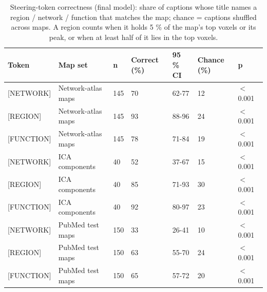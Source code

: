 \begin{table}[t]
\centering
\small
\caption{Steering-token correctness (final model): share of captions whose title names a region / network / function that matches the map; chance = captions shuffled across maps. A region counts when it holds 5 \% of the map's top voxels or its peak, or when at least half of it lies in the top voxels.}
\label{tab:steering_correctness}
\begin{tabular}{lllllll}
\toprule
Token & Map set & n & Correct (\%) & 95 \% CI & Chance (\%) & p \\
\midrule
{[}NETWORK{]} & Network-atlas maps & 145 & 70 & 62-77 & 12 & $<$ 0.001 \\
{[}REGION{]} & Network-atlas maps & 145 & 93 & 88-96 & 24 & $<$ 0.001 \\
{[}FUNCTION{]} & Network-atlas maps & 145 & 78 & 71-84 & 19 & $<$ 0.001 \\
{[}NETWORK{]} & ICA components & 40 & 52 & 37-67 & 15 & $<$ 0.001 \\
{[}REGION{]} & ICA components & 40 & 85 & 71-93 & 30 & $<$ 0.001 \\
{[}FUNCTION{]} & ICA components & 40 & 92 & 80-97 & 23 & $<$ 0.001 \\
{[}NETWORK{]} & PubMed test maps & 150 & 33 & 26-41 & 10 & $<$ 0.001 \\
{[}REGION{]} & PubMed test maps & 150 & 63 & 55-70 & 24 & $<$ 0.001 \\
{[}FUNCTION{]} & PubMed test maps & 150 & 65 & 57-72 & 20 & $<$ 0.001 \\
\bottomrule
\end{tabular}
\end{table}
